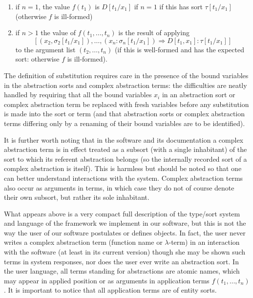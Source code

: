 \documentclass[12pt]{article}
\begin{document}
\begin{enumerate}

\item if $n=1$, the value $f(t_1)$ is $D[t_1/x_1]$ if $n=1$ if this has sort $\tau[t_1/x_1]$ (otherwise $f$ is ill-formed)


\item if $n>1$ the value of $f(t_1,\ldots,t_n)$ is the result of applying $$[(x_2,\sigma_2[t_1/x_1]),\ldots,(x_n:\sigma_n[t_1/x_1]) \Rightarrow D[t_1,x_1]:\tau[t_1/x_1]]$$ to the argument list $(t_2,\ldots,t_n)$ (if this is well-formed and has the expected sort:  otherwise $f$ is ill-formed).

\end{enumerate}

The definition of substitution requires care in the presence of the bound variables in the abstraction sorts and complex abstraction terms:  the difficulties are neatly handled by requiring that all the
bound variables $x_i$ in an abstraction sort or complex abstraction term be replaced with fresh variables before any substitution is made into the sort or term (and that abstraction sorts or complex abstraction terms differing only by a renaming of their bound variables are to be identified).

It is further worth noting that in the software and its documentation a complex abstraction term is in effect treated as a subsort (with a single inhabitant) of the sort to which its referent abstraction belongs (so the internally recorded sort of a complex abstraction is itself).  This is harmless but should be noted so that one can better understand interactions with the system.  Complex abstraction terms also occur as arguments in terms, in which case they do not of course denote their own subsort, but rather its sole inhabitant.

What appears above is a very compact full description of the type/sort system and language of the framework we implement in our software, but this is not the way the user of our software postulates or defines objects.  In fact, the user never writes a complex abstraction term (function name or $\lambda$-term) in an interaction with the software (at least in its current version) though she may be shown such terms in system responses, nor does the user ever write an abstraction sort.  In the user language, all terms standing for abstractions are atomic names, which may appear in applied position or as arguments in application terms $f(t_1,\ldots,t_n)$.  It is important to notice that all application terms are of entity sorts.
\end{document}
